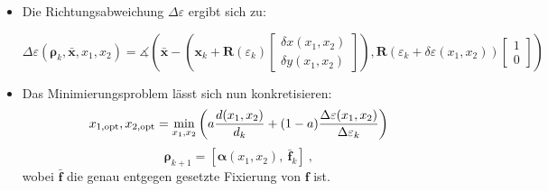 \documentclass[10pt,a4paper]{article}
\begin{document}
\begin{itemize}
	\item Die Richtungsabweichung $\Delta \varepsilon$ ergibt sich zu:
	
	\begin{equation}
	\Delta \varepsilon (\bm{\rho}_k, \bar{\bm{x}}, x_1, x_2) = \measuredangle\left( \bar{\bm{x}} - \left(\bm{x}_{k} + \bm{R}(\varepsilon_k)\begin{bmatrix}
	\delta x (x_1, x_2) \\ \delta y (x_1, x_2)
\end{bmatrix} \right), \bm{R}(\varepsilon_k + \delta \varepsilon (x_1, x_2)) \begin{bmatrix}
1 \\ 0
\end{bmatrix} \right)
	\end{equation}	
	
	
	\item Das Minimierungsproblem lässt sich nun konkretisieren:
	\begin{equation}
	x_{1, \textnormal{opt}}, x_{2, \textnormal{opt}} = \min_{x_1, x_2} \left( a \frac{d(x_1, x_2)}{d_k} + (1-a)\frac{\Delta \varepsilon (x_1, x_2)}{\Delta \varepsilon_k} \right)	
	\end{equation}
	\begin{equation}
	\bm{\rho}_{k+1} = [\bm{\alpha}(x_1, x_2),~ \bar{\bm{f}}_k]~,
	\end{equation}
	wobei $\bar{\bm{f}}$ die genau entgegen gesetzte Fixierung von $\bm{f}$ ist.
	
	
\end{itemize}
\end{document}
